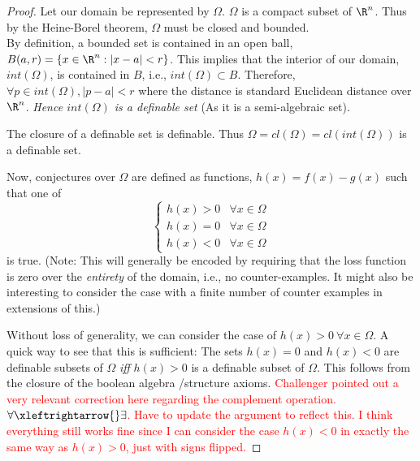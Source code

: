 \begin{proof}
    Let our domain be represented by $\Omega$. $\Omega$ is a compact subset of $\R^n$. Thus by the Heine-Borel theorem, $\Omega$ must be closed and bounded.\\ By definition, a bounded set is contained in an open ball, $B(a,r) = \{x\in\R^n:|x - a| < r\}$. This implies that the interior of our domain, $int(\Omega)$, is contained in $B$, i.e., $int(\Omega)\subset B$. Therefore, $\forall p\in int(\Omega), |p - a| < r$ where the distance is standard Euclidean distance over $\R^n$.\textit{ Hence $int(\Omega)$ is a definable set} (As it is a semi-algebraic set). 

    The closure of a definable set is definable. Thus $\Omega = cl(\Omega) = cl(int(\Omega))$ is a definable set.

    Now, conjectures over $\Omega$ are defined as functions, $h(x) = f(x) - g(x)$ such that one of
    \begin{equation*}
        \begin{cases}
            h(x) > 0 & \forall x \in \Omega \\
            h(x) = 0 & \forall x \in \Omega \\
            h(x) < 0 & \forall x \in \Omega 
        \end{cases}    
    \end{equation*}
    is true. (Note: This will generally be encoded by requiring that the loss function is zero over the \textit{entirety} of the domain, i.e., no counter-examples. It might also be interesting to consider the case with a finite number of counter examples in extensions of this.)
    \par Without loss of generality, we can consider the case of $h(x) > 0 \:\forall x\in\Omega$. A quick way to see that this is sufficient: The sets $h(x) = 0$ and $h(x) < 0 $ are definable subsets of $\Omega$ \textit{iff} $h(x) > 0$ is a definable subset of $\Omega$. This follows from the closure of the boolean algebra /structure axioms.
    \textcolor{red}{Challenger pointed out a very relevant correction here regarding the complement operation. $\forall\xleftrightarrow{}\exists$. Have to update the argument to reflect this. I think everything still works fine since I can consider the case $h(x) < 0$ in exactly the same way as $h(x) > 0$, just with signs flipped.}
    

\end{proof}

